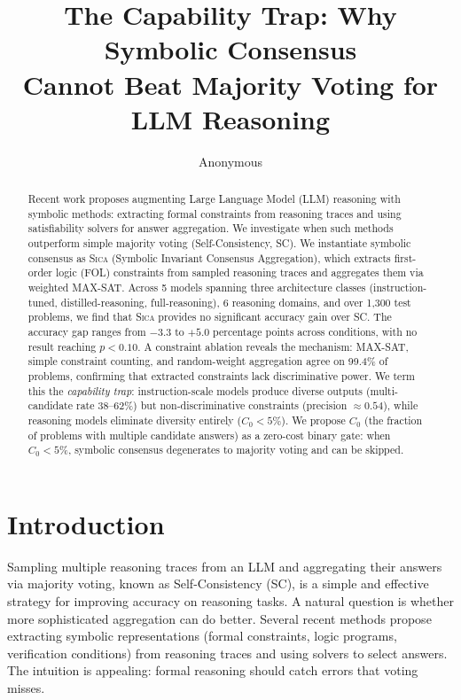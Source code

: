\documentclass[11pt,a4paper]{article}
\title{The Capability Trap: Why Symbolic Consensus\\Cannot Beat Majority Voting for LLM Reasoning}
\author{Anonymous}
\date{}
\newcommand{\sica}{\textsc{Sica}}
\newcommand{\czero}{C_0}
\begin{document}
\maketitle

\begin{abstract}
Recent work proposes augmenting Large Language Model (LLM) reasoning with symbolic methods: extracting formal constraints from reasoning traces and using satisfiability solvers for answer aggregation. We investigate when such methods outperform simple majority voting (Self-Consistency, SC). We instantiate symbolic consensus as \sica{} (Symbolic Invariant Consensus Aggregation), which extracts first-order logic (FOL) constraints from sampled reasoning traces and aggregates them via weighted MAX-SAT. Across 5 models spanning three architecture classes (instruction-tuned, distilled-reasoning, full-reasoning), 6 reasoning domains, and over 1,300 test problems, we find that \sica{} provides no significant accuracy gain over SC. The accuracy gap ranges from $-3.3$ to $+5.0$ percentage points across conditions, with no result reaching $p < 0.10$. A constraint ablation reveals the mechanism: MAX-SAT, simple constraint counting, and random-weight aggregation agree on 99.4\% of problems, confirming that extracted constraints lack discriminative power. We term this the \emph{capability trap}: instruction-scale models produce diverse outputs (multi-candidate rate 38--62\%) but non-discriminative constraints (precision $\approx 0.54$), while reasoning models eliminate diversity entirely ($\czero < 5\%$). We propose $\czero$ (the fraction of problems with multiple candidate answers) as a zero-cost binary gate: when $\czero < 5\%$, symbolic consensus degenerates to majority voting and can be skipped.
\end{abstract}

\section{Introduction}

Sampling multiple reasoning traces from an LLM and aggregating their answers via majority voting, known as Self-Consistency (SC), is a simple and effective strategy for improving accuracy on reasoning tasks. A natural question is whether more sophisticated aggregation can do better. Several recent methods propose extracting symbolic representations (formal constraints, logic programs, verification conditions) from reasoning traces and using solvers to select answers. The intuition is appealing: formal reasoning should catch errors that voting misses.
\end{document}
